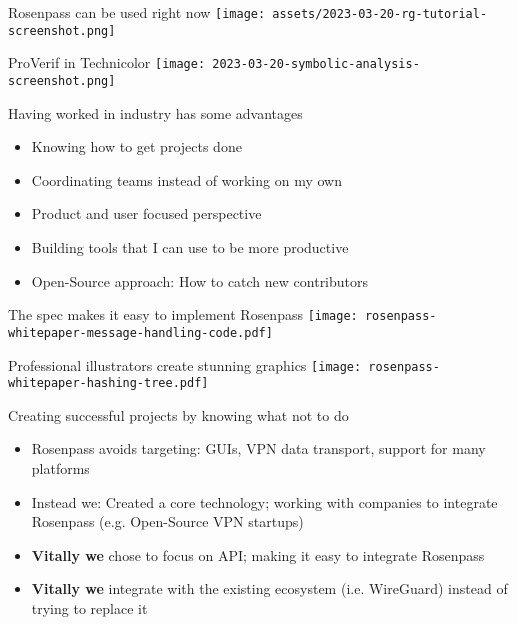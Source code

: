 \documentclass{rosenpass-beamer}
\begin{document}
  

\begin{frame}{Rosenpass can be used right now}
  \texttt{[image: assets/2023-03-20-rg-tutorial-screenshot.png]}
\end{frame}

\begin{frame}{ProVerif in Technicolor}
  \texttt{[image: 2023-03-20-symbolic-analysis-screenshot.png]}
\end{frame}

\begin{frame}{Having worked in industry has some advantages}
\begin{itemize}
  \item Knowing how to get projects done
  \item Coordinating teams instead of working on my own
  \item Product and user focused perspective
  \item Building tools that I can use to be more productive
  \item Open-Source approach: How to catch new contributors
\end{itemize}
\end{frame}

\begin{frame}{The spec makes it easy to implement Rosenpass}
  \texttt{[image: rosenpass-whitepaper-message-handling-code.pdf]}
\end{frame}

\begin{frame}{Professional illustrators create stunning graphics}
  \texttt{[image: rosenpass-whitepaper-hashing-tree.pdf]}
\end{frame}

\begin{frame}{Creating successful projects by knowing what not to do}
\begin{itemize}
  \item Rosenpass avoids targeting: GUIs, VPN data transport, support for many platforms
  \item Instead we: Created a core technology; working with companies to integrate Rosenpass (e.g. Open-Source VPN startups)
  \item \textbf{Vitally we} chose to focus on API; making it easy to integrate Rosenpass
  \item \textbf{Vitally we} integrate with the existing ecosystem (i.e. WireGuard) instead of trying to replace it
\end{itemize}
\end{frame}
\end{document}
